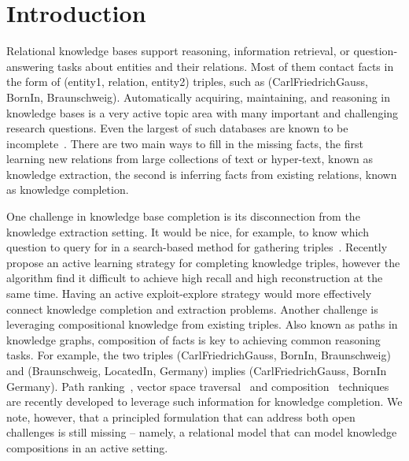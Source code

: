 
\section{Introduction}
\label{sec:intro}

Relational knowledge bases support reasoning, information retrieval, 
or question-answering tasks about entities and their relations.
Most of them contact facts in the form of (entity1, relation, entity2) triples, 
such as (CarlFriedrichGauss, BornIn, Braunschweig).
Automatically acquiring, maintaining, and reasoning in
knowledge bases is a very active topic area with many important and challenging research questions. 
Even the largest of such databases are known to be incomplete~\cite{dong2014knowledge}. %
There are two main ways to fill in the missing facts,
the first learning new relations from large collections of text or hyper-text,
known as knowledge extraction, 
the second is inferring facts from existing relations,%
known as knowledge completion. 

One challenge in knowledge base completion is 
its disconnection from the knowledge extraction setting. 
It would be nice, for example, to know which question to query for in 
a search-based method for gathering triples~\cite{west2014knowledge}. 
Recently \citet{kajino2015active} propose an active learning strategy for completing 
knowledge triples, however the algorithm find it difficult to achieve 
high recall and high reconstruction at the same time. 
Having an active exploit-explore strategy would more effectively 
connect knowledge completion and extraction problems. 
Another challenge is leveraging compositional knowledge from existing triples. 
Also known as paths in knowledge graphs, composition of facts is key to 
achieving common reasoning tasks. 
For example, the two triples (CarlFriedrichGauss, BornIn, Braunschweig)
and (Braunschweig, LocatedIn, Germany) implies (CarlFriedrichGauss, BornIn Germany). 
Path ranking~\cite{Lao2010}, vector space traversal~\cite{guu2015traversing}
and composition~\cite{Neelakantan2015} techniques 
are recently developed to leverage such information for knowledge completion. 
We note, however, that a principled formulation that can address 
both open challenges is still missing -- namely, a relational model 
that can model knowledge compositions in an active setting. 


